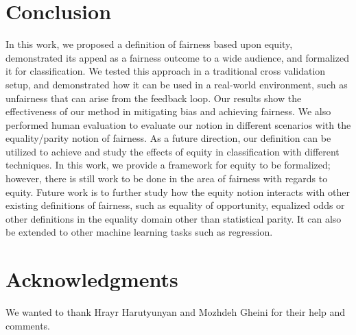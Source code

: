 \section{Conclusion}
 In this work, we proposed a definition of fairness based upon equity, demonstrated its appeal as a fairness outcome to a wide audience, and formalized it for classification. We tested this approach in a traditional cross validation setup, and demonstrated how it can be used in a real-world environment, such as unfairness that can arise from the feedback loop. Our results show the effectiveness of our method in mitigating bias and achieving fairness. We also performed human evaluation to evaluate our notion in different scenarios with the equality/parity notion of fairness. As a future direction, our definition can be utilized to achieve and study the effects of equity in classification with different techniques. In this work, we provide a framework for equity to be formalized; however, there is still work to be done in the area of fairness with regards to equity. Future work is to further study how the equity notion interacts with other existing definitions of fairness, such as equality of opportunity, equalized odds or other definitions in the equality domain other than statistical parity. It can also be extended to other machine learning tasks such as regression.

\section{Acknowledgments} 
We wanted to thank Hrayr Harutyunyan and Mozhdeh Gheini for their help and comments.

